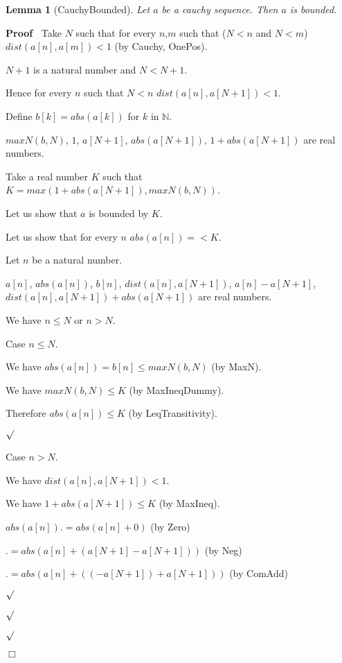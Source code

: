 \documentclass{article}
\newenvironment{forthel}{\begin{leftbar}}{\end{leftbar}}
\newenvironment{proof}{\noindent\textbf{Proof\ }}{\hspace*{\fill}$\Box$\medskip}
\newenvironment{subproof}{\begin{list}{}{}
		\item[\text{Proof}]}{\hfill $\surd$ \end{list}}
\newtheorem{lemma}{Lemma}
\newcommand{\NN}{\mathbb{N}}
\begin{document}
\begin{forthel}
	\begin{lemma}[CauchyBounded]
		Let $a$ be a cauchy sequence. Then $a$ is bounded.
	\end{lemma}
	\begin{proof}
		Take $N$ such that for every $n$,$m$ such that ($N < n$ and $N < m$) $dist(a[n],a[m]) < 1$ (by Cauchy, OnePos).
		
		$N + 1$ is a natural number and $N < N + 1$.
		
		Hence for every $n$ such that $N < n$ $dist(a[n],a[N + 1]) < 1$.
		
		Define $b[k] = abs(a[k])$ for $k$ in $\NN$.
		
		$maxN(b,N)$, $1$, $a[N + 1]$, $abs(a[N + 1])$, $1 + abs(a[N + 1])$ are real numbers.
		
		Take a real number $K$ such that $K = max(1 + abs(a[N + 1]), maxN(b,N))$.
		
		Let us show that $a$ is bounded by $K$.
		
		\begin{subproof}
			Let us show that for every $n$ $abs(a[n]) =< K$. 
			
			\begin{subproof}
				Let $n$ be a natural number.
				
				$a[n]$, $abs(a[n])$, $b[n]$, $dist(a[n],a[N + 1])$, $a[n] - a[N + 1]$, $dist(a[n],a[N + 1]) + abs(a[N + 1])$ are real numbers.
				
				We have $n \leq N$ or $n > N$.
				
				Case $n \leq N$.
				
				\begin{subproof}
					We have $abs(a[n]) = b[n] \leq maxN(b,N)$ (by MaxN).
					
					We have $maxN(b,N) \leq K$ (by MaxIneqDummy).
					
					Therefore $abs(a[n]) \leq K$ (by LeqTransitivity).
					
				\end{subproof}	
				
				Case $n > N$.
				
				\begin{subproof}
					We have $dist(a[n],a[N + 1]) < 1$.
					
					We have $1 + abs(a[N + 1]) \leq K$ (by MaxIneq).
					
					$abs(a[n]) .= abs(a[n] + 0)$ (by Zero)
					
					$.= abs(a[n] + (a[N + 1] - a[N + 1]))$ (by Neg)
					
					$.= abs(a[n] + ((-a[N + 1]) + a[N + 1]))$ (by ComAdd)
					

\end{subproof}
\end{subproof}
\end{subproof}
\end{proof}
\end{forthel}
\end{document}
